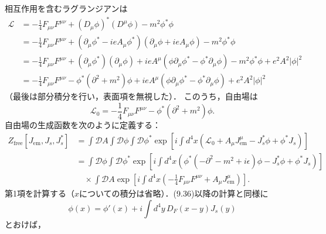 相互作用を含むラグランジアンは
\begin{align*}
  \mathcal{L} &= - \frac{1}{4} F_{\mu\nu} F^{\mu\nu} + (D_\mu \phi)^\ast (D^\mu \phi) - m^2 \phi^\ast \phi \\
  &= - \frac{1}{4} F_{\mu\nu} F^{\mu\nu} + (\partial_\mu \phi^\ast - ieA_\mu \phi^\ast) (\partial_\mu \phi + ieA_\mu \phi) - m^2 \phi^\ast \phi \\
  &= - \frac{1}{4} F_{\mu\nu} F^{\mu\nu} + (\partial_\mu \phi^\ast) (\partial_\mu \phi) + ieA^\mu (\phi \partial_\mu \phi^\ast - \phi^\ast \partial_\mu \phi) - m^2 \phi^\ast \phi + e^2A^2 \lvert \phi \rvert^2 \\
  &= - \frac{1}{4} F_{\mu\nu} F^{\mu\nu} - \phi^\ast (\partial^2 + m^2) \phi + ieA^\mu (\phi \partial_\mu \phi^\ast - \phi^\ast \partial_\mu \phi) + e^2A^2 \lvert \phi \rvert^2
\end{align*}
（最後は部分積分を行い，表面項を無視した）．
このうち，自由場は
\[ \mathcal{L}_0 =  - \frac{1}{4} F_{\mu\nu} F^{\mu\nu} - \phi^\ast (\partial^2 + m^2) \phi . \]
自由場の生成函数を次のように定義する：
\begin{align*}
  Z_\text{free}[J_\text{em}, J_s, J_s^\ast] &= \int \mathcal{D} A \int \mathcal{D} \phi \int \mathcal{D} \phi^\ast
  \exp \left[ i \int d^4x \left( \mathcal{L}_0 + A_\mu J_\text{em}^\mu - J_s^\ast \phi + \phi^\ast J_s \right) \right] \\
  &= \int \mathcal{D} \phi \int \mathcal{D} \phi^\ast \exp \left[ i \int d^4x \left( \phi^\ast (-\partial^2 - m^2 + i\epsilon) \phi - J_s^\ast \phi + \phi^\ast J_s \right) \right] \\
  & \quad \times \int \mathcal{D} A \exp \left[ i \int d^4x \left( - \frac{1}{4} F_{\mu\nu} F^{\mu\nu} + A_\mu J_\text{em}^\mu \right) \right] .
\end{align*}
第1項を計算する（$x$についての積分は省略）．(9.36)以降の計算と同様に
\[ \phi(x) = \phi'(x) + i \int d^4 y \, D_F(x-y) J_s(y) \]
とおけば，
